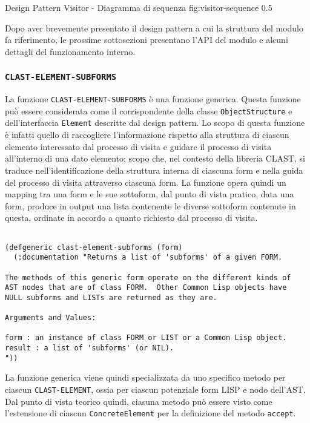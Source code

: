       {Design Pattern Visitor - Diagramma di sequenza}
      {fig:visitor-sequence}
      {0.5}

Dopo aver brevemente presentato il design pattern a cui la struttura del
modulo fa riferimento, le prossime sottosezioni presentano l'API del modulo e
alcuni dettagli del funzionamento interno.

\subsubsection{\texttt{CLAST-ELEMENT-SUBFORMS}}

La funzione \texttt{CLAST-ELEMENT-SUBFORMS} è una funzione generica. Questa
funzione può essere considerata come il corrispondente della classe
\texttt{ObjectStructure} e dell'interfaccia \texttt{Element} descritte dal
design pattern. Lo scopo di questa funzione è infatti quello di raccogliere
l'informazione rispetto alla struttura di ciascun elemento interessato dal
processo di visita e guidare il processo di visita all'interno di una dato
elemento; scopo che, nel contesto della libreria CLAST, si traduce
nell'identificazione della struttura interna di ciascuna form e nella guida
del processo di visita attraverso ciascuna form. La funzione opera quindi un
mapping tra una form e le sue sottoform, dal punto di vista pratico, data una
form, produce in output una lista contenente le diverse sottoform contenute in
questa, ordinate in accordo a quanto richiesto dal processo di visita.

\begin{lstlisting}[caption=Definizione della funzione \texttt
{CLAST-ELEMENT-SUBFORMS}]

(defgeneric clast-element-subforms (form)
  (:documentation "Returns a list of 'subforms' of a given FORM.

The methods of this generic form operate on the different kinds of
AST nodes that are of class FORM.  Other Common Lisp objects have
NULL subforms and LISTs are returned as they are.

Arguments and Values:

form : an instance of class FORM or LIST or a Common Lisp object.
result : a list of 'subforms' (or NIL).
"))

\end{lstlisting}

La funzione generica viene quindi specializzata da uno specifico metodo per
ciascun \texttt{CLAST-ELEMENT}, ossia per ciascun potenziale form LISP e nodo
dell'AST. Dal punto di vista teorico quindi, ciasuna metodo può essere visto
come l'estensione di ciascun \texttt{ConcreteElement} per la definizione del
metodo \texttt{accept}.\\


